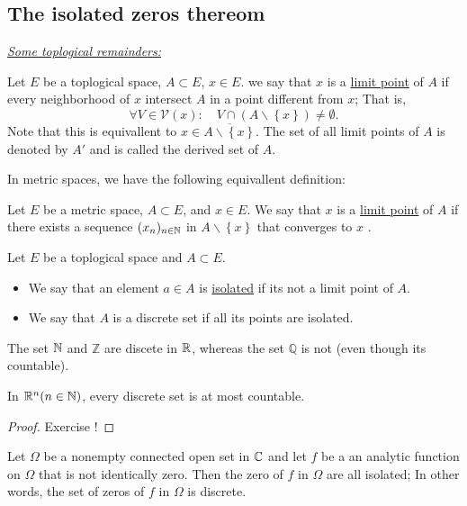 \subsection{The isolated zeros thereom}
\noindent \textcolor{larratBicep!10!brown}{
  \uline{ 
    \large \emph{  Some toplogical remainders:}
  }
}\\
\begin{definition}
  Let $E$ be a toplogical space,
  $A \subset E$, $x \in   E$. we say that $x$ is
  a \underline{limit point} of $A$ if every
  neighborhood of $x$ intersect $A$ in a point 
  different from $x$; That is, 
  \[
  \forall V \in   \mathcal{V} (x) : 
  \quad V \cap \left( A \backslash  \left\{ x \right\} \right) 
  \neq  \emptyset .
  \]
  Note that this is equivallent to $x \in  \overline{A \backslash  \left\{ x \right\}}$. The set
  of all limit points of $A$ is denoted by $A'$ and is called the derived set of $A$.
\end{definition}
 In metric spaces, we have the following equivallent definition:
\begin{definition}[]
  Let $E$ be a metric space, $A \subset E$, and $x \in   E$. We say that $x$ 
  is a \underline{limit point} of $A$ if there exists a sequence $(x_n ) _{n \in  \mathbb{N}}$ 
  in $A \backslash  \left\{ x \right\}$ that converges to $x$ .
\end{definition}
\divider
\begin{definition}[]
Let $E$ be a toplogical space and $A \subset E$. 
\begin{itemize}
  \item[\ding{172} ] We say that an element $a \in   A$ is \underline{isolated} if its not a limit point of 
    $A$.
  \item [\ding{173} ] We say that $A$ is a discrete set if all its points are isolated.
\end{itemize}
\end{definition}
\begin{example}
The set $\mathbb{N}$ and $\mathbb{Z}$ are discete in $\mathbb{R} $, whereas the set $\mathbb{Q}$ is not (even though its countable).
\end{example}
\begin{proposition}[]
In $\mathbb{R} ^n (n \in  \mathbb{N})  $, every discrete set is at most countable.
\end{proposition}
\begin{proof}
   Exercise !
\end{proof}
\begin{theorem}
  Let $\Omega$ be a nonempty connected open set in $\mathbb{C} $ and let $f$ be a an analytic function on $\Omega$ that is 
  not identically zero. Then the zero of $f$ in $\Omega$ are all isolated; In other words, the set of zeros of $f$ in
  $\Omega$ is discrete.
\end{theorem}
